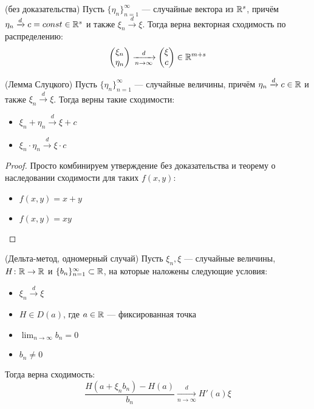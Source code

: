 \begin{proposition} (без доказательства)
	Пусть $\{\eta_n\}_{n = 1}^\infty$ --- случайные вектора из $\mathbb{R}^s$, причём $\eta_n \xrightarrow{d} c = const \in \mathbb{R}^s$ и также $\xi_n \xrightarrow{d} \xi$. Тогда верна векторная сходимость по распределению:
	\[
		\begin{pmatrix}
			\xi_n
			\\
			\eta_n
		\end{pmatrix}
		\xrightarrow[n \to \infty]{d}
		\begin{pmatrix}
			\xi
			\\
			c
		\end{pmatrix}
		\in \mathbb{R}^{m + s}
	\] 
\end{proposition}

\begin{corollary} (Лемма Слуцкого)
	Пусть $\{\eta_n\}_{n = 1}^\infty$ --- случайные величины, причём $\eta_n \xrightarrow{d} c \in \mathbb{R}$ и также $\xi_n \xrightarrow{d} \xi$. Тогда верны такие сходимости:
	\begin{itemize}
		\item \(\xi_n + \eta_n \xrightarrow{d} \xi + c\)
		
		\item \(\xi_n \cdot \eta_n \xrightarrow{d} \xi \cdot c\)
	\end{itemize}
\end{corollary}

\begin{proof}
	Просто комбинируем утверждение без доказательства и теорему о наследовании сходимости для таких $f(x, y)$:
	\begin{itemize}
		\item $f(x, y) = x + y$
		
		\item $f(x, y) = xy$
	\end{itemize}
\end{proof}

\begin{theorem} (Дельта-метод, одномерный случай)
	Пусть $\xi_n, \xi$ --- случайные величины, $H \colon \mathbb{R} \to \mathbb{R}$ и $\{b_n\}_{n = 1}^\infty \subset \mathbb{R}$, на которые наложены следующие условия:
	\begin{itemize}
		\item $\xi_n \xrightarrow{d} \xi$
		
		\item $H \in D(a)$, где $a \in \mathbb{R}$ --- фиксированная точка
		
		\item $\lim_{n \to \infty} b_n = 0$
		
		\item $b_n \neq 0$
	\end{itemize}
	Тогда верна сходимость:
	\[
		\frac{H(a + \xi_nb_n) - H(a)}{b_n} \xrightarrow[n \to \infty]{d} H'(a)\xi
	\]
\end{theorem}


